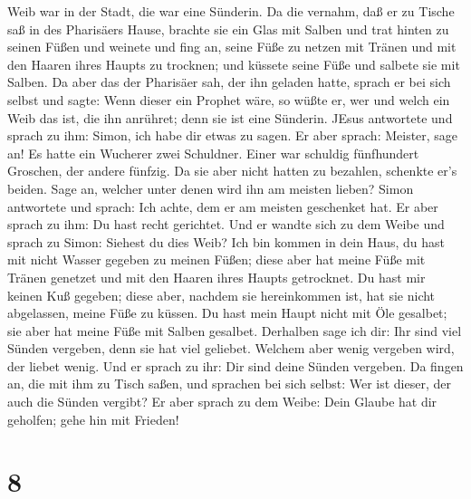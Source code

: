 Weib war in der Stadt, die war eine Sünderin. Da die vernahm, daß er zu
Tische saß in des Pharisäers Hause, brachte sie ein Glas mit Salben
 und trat hinten zu seinen Füßen und weinete und fing an,
seine Füße zu netzen mit Tränen und mit den Haaren ihres Haupts zu
trocknen; und küssete seine Füße und salbete sie mit Salben.
 Da aber das der Pharisäer sah, der ihn geladen hatte,
sprach er bei sich selbst und sagte: Wenn dieser ein Prophet wäre, so
wüßte er, wer und welch ein Weib das ist, die ihn anrühret; denn sie ist
eine Sünderin.  JEsus antwortete und sprach zu ihm: Simon,
ich habe dir etwas zu sagen. Er aber sprach: Meister, sage an!
 Es hatte ein Wucherer zwei Schuldner. Einer war schuldig
fünfhundert Groschen, der andere fünfzig.  Da sie aber
nicht hatten zu bezahlen, schenkte er's beiden. Sage an, welcher unter
denen wird ihn am meisten lieben?  Simon antwortete und
sprach: Ich achte, dem er am meisten geschenket hat. Er aber sprach zu
ihm: Du hast recht gerichtet.  Und er wandte sich zu dem
Weibe und sprach zu Simon: Siehest du dies Weib? Ich bin kommen in dein
Haus, du hast mit nicht Wasser gegeben zu meinen Füßen; diese aber hat
meine Füße mit Tränen genetzet und mit den Haaren ihres Haupts
getrocknet.  Du hast mir keinen Kuß gegeben; diese aber,
nachdem sie hereinkommen ist, hat sie nicht abgelassen, meine Füße zu
küssen.  Du hast mein Haupt nicht mit Öle gesalbet; sie
aber hat meine Füße mit Salben gesalbet.  Derhalben sage
ich dir: Ihr sind viel Sünden vergeben, denn sie hat viel geliebet.
Welchem aber wenig vergeben wird, der liebet wenig.  Und er
sprach zu ihr: Dir sind deine Sünden vergeben.  Da fingen
an, die mit ihm zu Tisch saßen, und sprachen bei sich selbst: Wer ist
dieser, der auch die Sünden vergibt?  Er aber sprach zu dem
Weibe: Dein Glaube hat dir geholfen; gehe hin mit Frieden!

\hypertarget{section-7}{%
\section{8}\label{section-7}}

